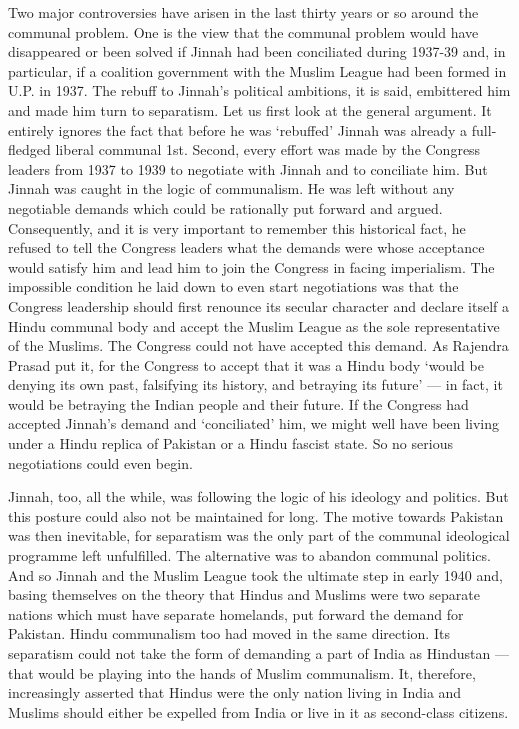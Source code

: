 Two major controversies have arisen in the last thirty years or so around the communal problem. One is the view that the communal problem would have disappeared or been solved if Jinnah had been conciliated during 1937-39 and, in particular, if a coalition government with the Muslim League had been formed in U.P. in 1937. The rebuff to Jinnah's political ambitions, it is said, embittered him and made him turn to separatism. Let us first look at the general argument. It entirely ignores the fact that before he was `rebuffed' Jinnah was already a full- fledged liberal communal 1st. Second, every effort was made by the Congress leaders from 1937 to 1939 to negotiate with Jinnah and to conciliate him. But Jinnah was caught in the logic of communalism. He was left without any negotiable demands which could be rationally put forward and argued. Consequently, and it is very important to remember this historical fact, he refused to tell the Congress leaders what the demands were whose acceptance would satisfy him and lead him to join the Congress in facing imperialism. The impossible condition he laid down to even start negotiations was that the Congress leadership should first renounce its secular character and declare itself a Hindu communal body and accept the Muslim League as the sole representative of the Muslims. The Congress could not have accepted this demand. As Rajendra Prasad put it, for the Congress to accept that it was a Hindu body `would be denying its own past, falsifying its history, and betraying its future' — in fact, it would be betraying the Indian people and their future. If the Congress had accepted Jinnah's demand and `conciliated' him, we might well have been living under a Hindu replica of Pakistan or a Hindu fascist state. So no serious negotiations could even begin. 

Jinnah, too, all the while, was following the logic of his ideology and politics. But this posture could also not be maintained for long. The motive towards Pakistan was then inevitable, for separatism was the only part of the communal ideological programme left unfulfilled. The alternative was to abandon communal politics. And so Jinnah and the Muslim League took the ultimate step in early 1940 and, basing themselves on the theory that Hindus and Muslims were two separate nations which must have separate homelands, put forward the demand for Pakistan. Hindu communalism too had moved in the same direction. Its separatism could not take the form of demanding a part of India as Hindustan — that would be playing into the hands of Muslim communalism. It, therefore, increasingly asserted that Hindus were the only nation living in India and Muslims should either be expelled from India or live in it as second-class citizens. 

